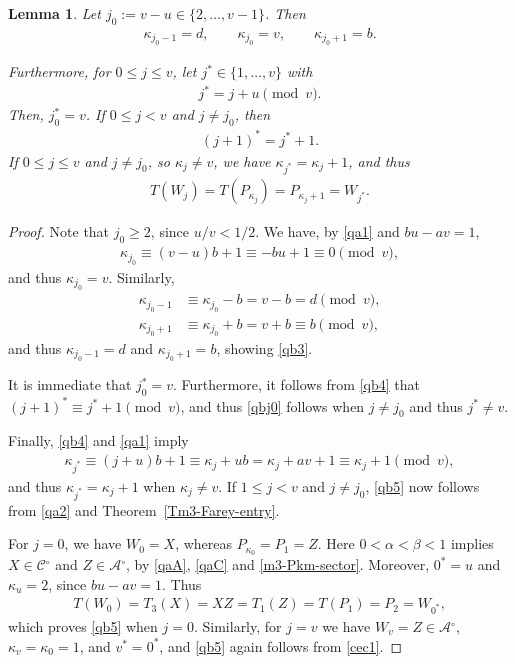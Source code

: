 \documentclass[11pt,reqno,tbtags,a4paper]{amsart}
\numberwithin{equation}{section}
\renewcommand\le{\leq}
\renewcommand\ge{\geq}
\renewcommand\leq{\leqslant}
\renewcommand\geq{\geqslant}
\theoremstyle{plain}%
\newtheorem{lemma}[theorem]{Lemma}
\theoremstyle{definition}
\theoremstyle{remark}
\newcommand{\refT}[1]{Theorem~\ref{#1}}
\newcommand\set[1]{\ensuremath{\{#1\}}}
\newcommand\inter{\ensuremath{^\circ}}
\newcommand\kk{\kappa}
\newcommand\cA{\mathcal A}
\newcommand\cC{\mathcal C}
\newcommand\jx{{j^*}}
\newcommand\jox{j_0^*}
\newcommand\0{{\boldsymbol 0}}
\newcommand\1{{\boldsymbol 1}}
\begin{document}
\begin{lemma}\label{LQ4}
  Let $j_0:=v-u\in\set{2,\dots,v-1}$.
Then
\begin{align}\label{qb3}
  \kk_{j_0-1}=d,
\qquad %
\kk_{j_0}=v,
\qquad
  \kk_{j_0+1}=b.
\end{align}

Furthermore, for $0\le j\le v$, let $\jx\in\set{1,\dots,v}$ with
\begin{align}\label{qb4}
  \jx=j+u\pmod v.
\end{align}
Then, $\jox=v$.  
If $0\le j<v$ and $j\neq j_0$, then
\begin{align}
  \label{qbj0}
(j+1)^* = \jx+1.
\end{align}
If $0\le j\le v$ and $j\neq j_0$, so $\kk_j\neq v$, we have 
$\kk_{\jx}=\kk_j+1$, and thus
\begin{align}\label{qb5}
T(W_j)=T(P_{\kk_j})=P_{\kk_{j}+1}=  W_{\jx}.
\end{align}
\end{lemma}

\begin{proof}
Note that $j_0\ge2$, since $u/v<1/2$.
We have, by \eqref{qa1} and $bu-av=1$,
\begin{align}\label{qb6}
  \kk_{j_0}\equiv (v-u)b+1 \equiv -bu+1 \equiv 0 \pmod v,
\end{align}
and thus $\kk_{j_0}=v$.
Similarly,
\begin{align}\label{qb7-}
  \kk_{j_0-1}&\equiv \kk_{j_0}-b = v-b = d \pmod v,
\\\label{qb7+}
  \kk_{j_0+1}&\equiv \kk_{j_0}+b = v+b \equiv b \pmod v,
\end{align}
and thus $\kk_{j_0-1}=d$ and $\kk_{j_0+1}=b$, 
showing \eqref{qb3}.

It is immediate that $\jox=v$.
Furthermore, it follows from \eqref{qb4} that $(j+1)^*\equiv\jx+1\pmod v$,
and thus \eqref{qbj0} follows when $j\neq j_0$ and thus $\jx\neq v$.

Finally, \eqref{qb4} and \eqref{qa1} imply
\begin{align}
  \kk_{\jx}\equiv(j+u)b+1
\equiv \kk_j+ub
=\kk_j+av+1
\equiv\kk_j+1
\pmod v,
\end{align}
and thus $\kk_{\jx}=\kk_j+1$ when $\kk_j\neq v$.
If $1\le j< v$ and $j\neq j_0$, \eqref{qb5} now follows from
\eqref{qa2} and \refT{Tm3-Farey-entry}.

For $j=0$, we have $W_0=X$, whereas $P_{\kappa_0}=P_1=Z$.
Here $0<\alpha<\beta<1$ implies $X\in\cC\inter$ and $Z\in\cA\inter$,
by \eqref{qaA}, \eqref{qaC} and \eqref{m3-Pkm-sector}. 
Moreover, $0^*=u$ and $\kappa_u=2$, since $bu-av=1$.  Thus
\begin{align}\label{cec1}
 T(W_0)=T_3(X)=XZ=T_1(Z)=T(P_1)=P_2=W_{0^*},
\end{align}
which proves \eqref{qb5} when $j=0$.
Similarly, for $j=v$ we have $W_v=Z\in\cA\inter$, $\kk_v=\kk_0=1$, and
$v^*=0^*$, and \eqref{qb5} again follows from \eqref{cec1}.
\end{proof}
\end{document}
